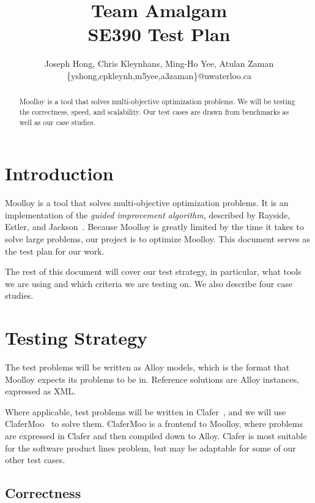 \documentclass[11pt]{article}
\title{{\Large Team Amalgam} \\ SE390 Test Plan}
\author{Joseph Hong, Chris Kleynhans, Ming-Ho Yee, Atulan Zaman \\
        \{yshong,cpkleynh,m5yee,a3zaman\}@uwaterloo.ca}
\begin{document}
\maketitle

\begin{abstract}
Moolloy is a tool that solves multi-objective optimization problems.
We will be testing the correctness, speed, and scalability. Our test
cases are drawn from benchmarks as well as our case studies.
\end{abstract}

\tableofcontents
\newpage

\section{Introduction}\label{sec:intro}

Moolloy is a tool that solves multi-objective optimization problems. It
is an implementation of the \textit{guided improvement algorithm},
described by Rayside, Estler, and Jackson~\cite{ref:Rayside09}. Because
Moolloy is greatly limited by the time it takes to solve large
problems, our project is to optimize Moolloy. This document serves as
the test plan for our work.

The rest of this document will cover our test strategy, in particular,
what tools we are using and which criteria we are testing on. We also
describe four case studies.

\section{Testing Strategy}\label{sec:strategy}

The test problems will be written as Alloy models, which is the format
that Moolloy expects its problems to be in. Reference solutions are
Alloy instances, expressed as XML.\@

Where applicable, test problems will be written in
Clafer~\cite{ref:Bak10}, and we will use
ClaferMoo~\cite{ref:Olaechea12} to solve them. ClaferMoo is a frontend
to Moolloy, where problems are expressed in Clafer and then compiled
down to Alloy. Clafer is most suitable for the software product lines
problem, but may be adaptable for some of our other test cases.

\subsection{Correctness}\label{sec:correctness}
\end{document}
